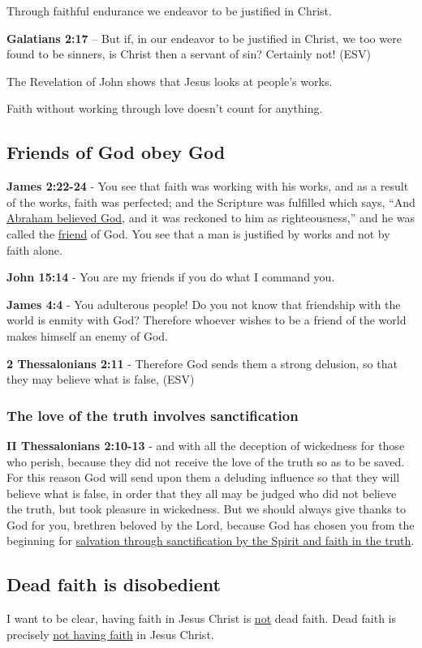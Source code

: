 \documentclass[11pt]{article}
\begin{document}
Through faithful endurance we endeavor to be justified in Christ.

\textbf{Galatians 2:17} -- But if, in our endeavor to be justified in Christ, we too were found to be sinners, is Christ then a servant of sin? Certainly not! (ESV)

The Revelation of John shows that Jesus looks at people's works.

Faith without working through love doesn't count for anything.

\subsection{Friends of God obey God}
\label{sec:org619c662}
\textbf{James 2:22-24} - You see that faith was working with his works, and as a result of the works, faith was perfected; and the Scripture was fulfilled which says, “And \uline{Abraham believed God}, and it was reckoned to him as righteousness,” and he was called the \uline{friend} of God. You see that a man is justified by works and not by faith alone.

\textbf{John 15:14} - You are my friends if you do what I command you.

\textbf{James 4:4} - You adulterous people! Do you not know that friendship with the world is enmity with God? Therefore whoever wishes to be a friend of the world makes himself an enemy of God.

\textbf{2 Thessalonians 2:11} -  Therefore God sends them a strong delusion, so that they may believe what is false, (ESV)

\subsubsection{The love of the truth involves sanctification}
\label{sec:orgaf34b49}
\textbf{II Thessalonians 2:10-13} - and with all the deception of wickedness for those who perish, because they did not receive the love of the truth so as to be saved. For this reason God will send upon them a deluding influence so that they will believe what is false, in order that they all may be judged who did not believe the truth, but took pleasure in wickedness. But we should always give thanks to God for you, brethren beloved by the Lord, because God has chosen you from the beginning for \uline{salvation through sanctification by the Spirit and faith in the truth}.

\subsection{Dead faith is disobedient}
\label{sec:orgbe6c94d}
I want to be clear, having faith in Jesus Christ is \uline{not} dead faith.
Dead faith is precisely \uline{not having faith} in Jesus Christ.
\end{document}
